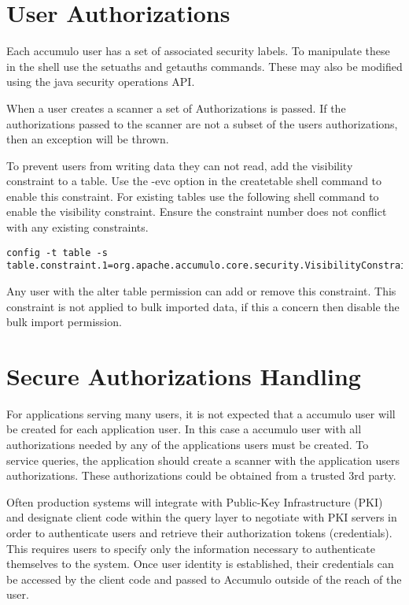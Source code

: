\section{User Authorizations}

Each accumulo user has a set of associated security labels.  To manipulate
these in the shell use the setuaths and getauths commands.  These may also be
modified using the java security operations API.   

When a user creates a scanner a set of Authorizations is passed.  If the
authorizations passed to the scanner are not a subset of the users
authorizations, then an exception will be thrown.

To prevent users from writing data they can not read, add the visibility
constraint to a table.  Use the -evc option in the createtable shell command to
enable this constraint.  For existing tables use the following shell command to
enable the visibility constraint.  Ensure the constraint number does not
conflict with any existing constraints.
  
\small
\begin{verbatim}
config -t table -s table.constraint.1=org.apache.accumulo.core.security.VisibilityConstraint
\end{verbatim}
\normalsize

Any user with the alter table permission can add or remove this constraint.
This constraint is not applied to bulk imported data, if this a concern then
disable the bulk import permission.

\section{Secure Authorizations Handling}

For applications serving many users, it is not expected that a accumulo user
will be created for each application user.  In this case a accumulo user with
all authorizations needed by any of the applications users must be created.  To
service queries, the application should create a scanner with the application
users authorizations.  These authorizations could be obtained from a trusted 3rd
party.

Often production systems will integrate with Public-Key Infrastructure (PKI) and
designate client code within the query layer to negotiate with PKI servers in order
to authenticate users and retrieve their authorization tokens (credentials). This
requires users to specify only the information necessary to authenticate themselves
to the system. Once user identity is established, their credentials can be accessed by
the client code and passed to Accumulo outside of the reach of the user.


